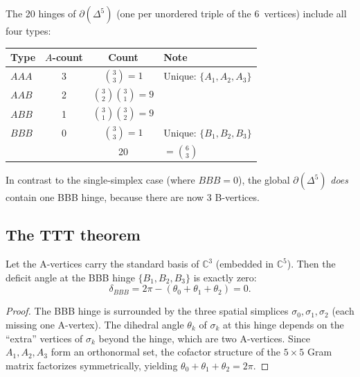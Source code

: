 The 20 hinges of $\partial(\Delta^5)$ (one per unordered triple of the 6~vertices) include all four types:

\begin{center}
\begin{tabular}{lccl}
\toprule
Type & $A$-count & Count & Note \\
\midrule
$AAA$ & 3 & $\binom{3}{3} = 1$ & Unique: $\{A_1, A_2, A_3\}$ \\
$AAB$ & 2 & $\binom{3}{2}\binom{3}{1} = 9$ & \\
$ABB$ & 1 & $\binom{3}{1}\binom{3}{2} = 9$ & \\
$BBB$ & 0 & $\binom{3}{3} = 1$ & Unique: $\{B_1, B_2, B_3\}$ \\
\midrule
& & 20 & $= \binom{6}{3}$ \\
\bottomrule
\end{tabular}
\end{center}

\noindent
In contrast to the single-simplex case (where $BBB = 0$), the global $\partial(\Delta^5)$ \emph{does} contain one BBB hinge, because there are now 3 B-vertices.

\subsection{The TTT theorem}
\label{sec:ttt}

\begin{theorem}
\label{thm:ttt}
Let the A-vertices carry the standard basis of $\mathbb{C}^3$ (embedded in $\mathbb{C}^5$).  Then the deficit angle at the BBB hinge $\{B_1, B_2, B_3\}$ is exactly zero:
\begin{equation}
\delta_{BBB} = 2\pi - (\theta_0 + \theta_1 + \theta_2) = 0.
\end{equation}
\end{theorem}

\begin{proof}
The BBB hinge is surrounded by the three spatial simplices $\sigma_0, \sigma_1, \sigma_2$ (each missing one A-vertex).  The dihedral angle $\theta_k$ of $\sigma_k$ at this hinge depends on the ``extra'' vertices of $\sigma_k$ beyond the hinge, which are two A-vertices.  Since $A_1, A_2, A_3$ form an orthonormal set, the cofactor structure of the $5 \times 5$ Gram matrix factorizes symmetrically, yielding $\theta_0 + \theta_1 + \theta_2 = 2\pi$.
\end{proof}

